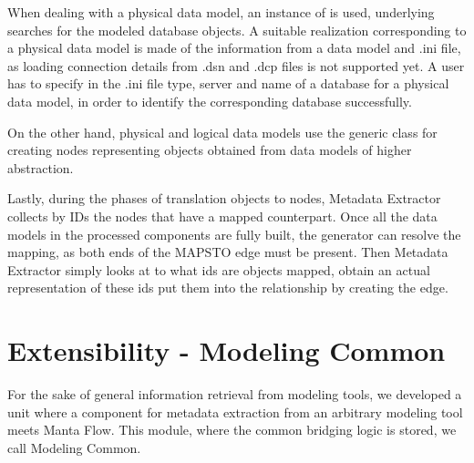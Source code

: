 When dealing with a physical data model, an instance of  is used, underlying  searches for the modeled database objects. 
A suitable  realization corresponding to a physical data model is made of the information from a data model and .ini file, as loading connection details from .dsn and .dcp files is not supported yet. A user has to specify in the .ini file type, server and name of a database for a physical data model, in order to identify the corresponding database successfully.

On the other hand, physical and logical data models use the generic  class for creating nodes representing objects obtained from data models of higher abstraction.

Lastly, during the phases of translation objects to nodes, Metadata Extractor collects by IDs the nodes that have a mapped counterpart.
Once all the data models in the processed components are fully built, the generator can resolve the mapping, as both ends of the MAPS\textunderscore TO edge must be present. 
Then Metadata Extractor simply looks at to what ids are objects mapped, obtain an actual representation of these ids put them into the relationship by creating the edge.

\section{Extensibility - Modeling Common}
\label{modeling_common}

For the sake of general information retrieval from modeling tools, we developed a unit where a component for metadata extraction from an arbitrary modeling tool meets Manta Flow.
This module, where the common bridging logic is stored, we call Modeling Common.


